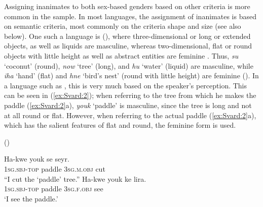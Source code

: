 \documentclass[output=collectionpaper]{langsci/langscibook}
\begin{document}
\newpage 
Assigning inanimates to both sex-based genders based on other criteria is more common in the sample. In most languages, the assignment of inanimates is based on semantic criteria, most commonly on the criteria shape and size (see also  below). One such a language is  (), where three-dimensional or long or extended objects, as well as liquids are masculine, whereas two-dimensional, flat or round objects with little height as well as abstract entities are feminine \citep[47]{Lock2011}. Thus, \textit{su} `coconut' (round), \textit{now} `tree' (long), and \textit{hu} `water' (liquid) are masculine, while \textit{iha} `hand' (flat) and \textit{hne} `bird's nest' (round with little height) are feminine (\citealt[48--50]{Lock2011}). In a language such as , this is very much based on the speaker's perception. This can be seen in (\ref{ex:Svard:2}); when referring to the tree from which he makes the paddle (\ref{ex:Svard:2}a), \textit{youk} `paddle' is masculine, since the tree is long and not at all round or flat. However, when referring to the actual paddle (\ref{ex:Svard:2}a), which has the salient features of flat and round, the feminine form is used.


\ea
\label{ex:Svard:2}
 () \citep[50]{Lock2011}\\
\begin{xlist}
\ex
\gll Ha-kwe youk se seyr.\\
     \textsc{1sg.sbj-top} paddle \textsc{3sg.m.obj} cut\\
\glt ``I cut the `paddle' tree.''
\ex
\gll Ha-kwe youk ke lira.\\
     \textsc{1sg.sbj-top} paddle \textsc{3sg.f.obj} see\\
\glt `I see the paddle.'
\end{xlist}
\z
\end{document}
